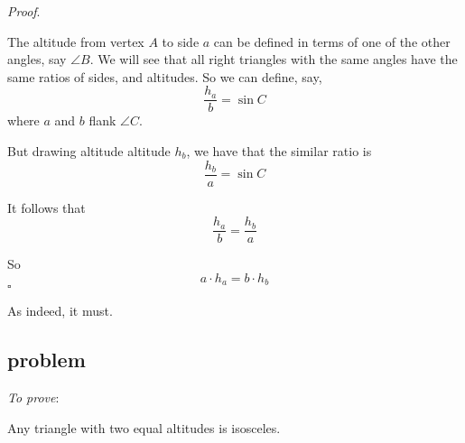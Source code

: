\documentclass[11pt, oneside]{article}
\begin{document}
\emph{Proof}.

The altitude from vertex $A$ to side $a$ can be defined in terms of one of the other angles, say $\angle B$.  We will see that all right triangles with the same angles have the same ratios of sides, and altitudes.  So we can define, say,
\[ \frac{h_a}{b} = \sin C \]
where $a$ and $b$ flank $\angle C$.

But drawing altitude altitude $h_b$, we have that the similar ratio is
\[ \frac{h_b}{a} = \sin C \]

It follows that
\[ \frac{h_a}{b} = \frac{h_b}{a}  \]

So
\[ a \cdot h_a = b \cdot h_b \]
$\square$

As indeed, it must.

\subsection*{problem}

\emph{To prove}:

Any triangle with two equal altitudes is isosceles.
\end{document}
